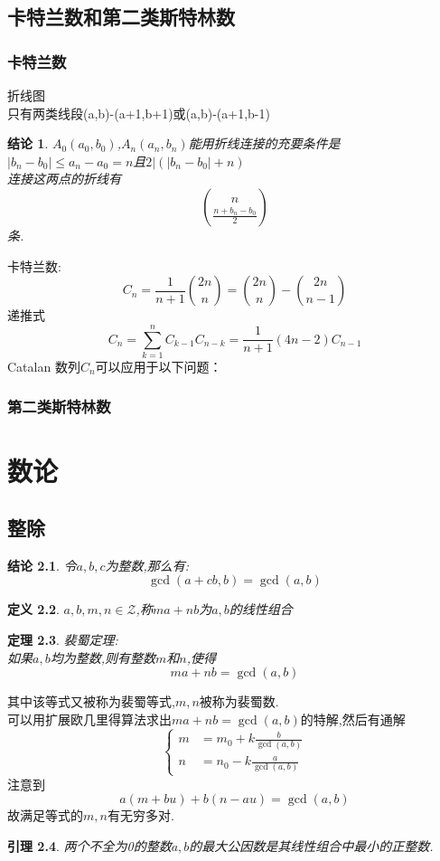 \documentclass[12pt, a4paper, oneside]{ctexbook}
\newtheorem{theorem}{定理}[section]
\newtheorem{definition}[theorem]{定义}
\newtheorem{lemma}[theorem]{引理}
\newtheorem{proposition}[theorem]{结论}
\begin{document}
\section{卡特兰数和第二类斯特林数}
\subsection{卡特兰数}
折线图\\
只有两类线段(a,b)-(a+1,b+1)或(a,b)-(a+1,b-1)\\
\begin{proposition}
  $A_0(a_0,b_0)$,$A_n(a_n,b_n)$能用折线连接的充要条件是\\
  $|b_n-b_0|\le a_n-a_0=n$且$2|(|b_n-b_0|+n)$\\
  连接这两点的折线有
  $$
  \binom{n}{\frac{n+b_n-b_0}{2}}
  $$
  条.
\end{proposition}
卡特兰数:\\
$$
C_n=\frac{1}{n+1}\binom{2n}{n}=\binom{2n}{n}-\binom{2n}{n-1}
$$
递推式\\
$$
C_n=\sum_{k=1}^{n}C_{k-1}C_{n-k}=\frac{1}{n+1} (4n-2)C_{n-1}
$$
Catalan 数列$C_n$可以应用于以下问题：\\


\subsection{第二类斯特林数}




\chapter{数论}
\section{整除}

\begin{proposition}
  令$a,b,c$为整数,那么有:
  $$
  \gcd(a+cb,b)=\gcd(a,b)
  $$
\end{proposition}

\begin{definition}
  $a,b,m,n\in \mathcal{Z}$,称$ma+nb$为$a,b$的线性组合
\end{definition}


\begin{theorem}
  裴蜀定理:\\
  如果$a,b$均为整数,则有整数$m$和$n$,使得
  $$
  ma+nb=\gcd(a,b)
  $$
\end{theorem}
其中该等式又被称为裴蜀等式,$m,n$被称为裴蜀数.\\
可以用扩展欧几里得算法求出$ma+nb=\gcd(a,b)$的特解,然后有通解
$$
\begin{cases}
  m&=m_0+k\frac{b}{\gcd(a,b)}\\
  n&=n_0-k\frac{a}{\gcd(a,b)}
\end{cases}
$$
注意到
$$
a(m+bu)+b(n-au)=\gcd(a,b)
$$
故满足等式的$m,n$有无穷多对.
\begin{lemma}
  两个不全为0的整数$a,b$的最大公因数是其线性组合中最小的正整数.
\end{lemma}
\end{document}
